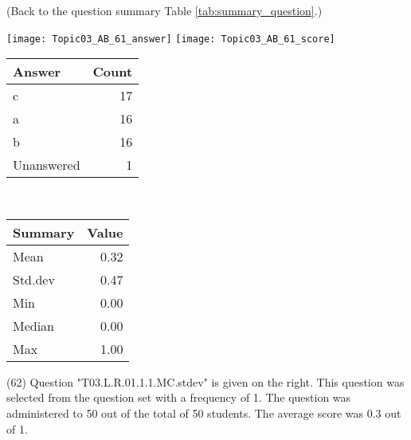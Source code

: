 \documentclass[12pt,english,nohyper]{tufte-handout}\usepackage[]{graphicx}\usepackage[]{color}
\begin{document}
 (Back to the question summary Table \ref{tab:summary_question}.)

\begin{center} \texttt{[image: Topic03\_AB\_61\_answer]} \texttt{[image: Topic03\_AB\_61\_score]} \end{center} 

\begin{center}%
\begin{tabular}{lr}
  \hline
Answer & Count \\ 
  \hline
c &  17 \\ 
  a &  16 \\ 
  b &  16 \\ 
  Unanswered &   1 \\ 
   \hline
\end{tabular}
~~~~~~~~%
\begin{tabular}{lr}
  \hline
Summary & Value \\ 
  \hline
Mean & 0.32 \\ 
  Std.dev & 0.47 \\ 
  Min & 0.00 \\ 
  Median & 0.00 \\ 
  Max & 1.00 \\ 
   \hline
\end{tabular}
\end{center}\newpage{} (62) Question "T03.L.R.01.1.1.MC.stdev" is given on the right. This question was selected from the question set with a frequency of 1. The question was administered to 50 out of the total of 50 students. The average score was 0.3 out of 1.
\end{document}
